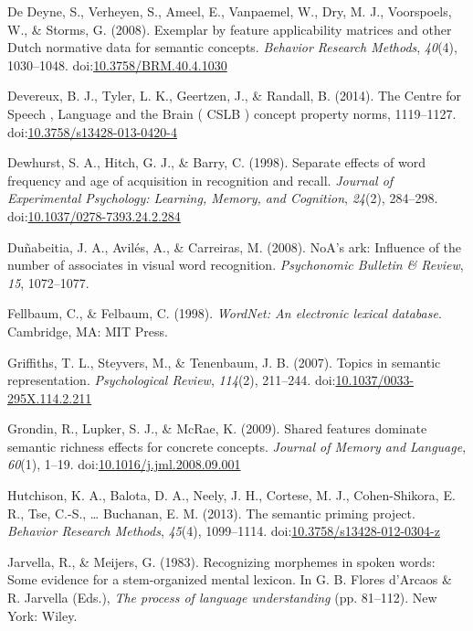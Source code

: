 \documentclass[english,,man]{apa6}
\theoremstyle{definition}
\theoremstyle{definition}
\theoremstyle{definition}
\theoremstyle{remark}
\begin{document}
\hypertarget{ref-DeDeyne2008}{}
De Deyne, S., Verheyen, S., Ameel, E., Vanpaemel, W., Dry, M. J.,
Voorspoels, W., \& Storms, G. (2008). Exemplar by feature applicability
matrices and other Dutch normative data for semantic concepts.
\emph{Behavior Research Methods}, \emph{40}(4), 1030--1048.
doi:\href{https://doi.org/10.3758/BRM.40.4.1030}{10.3758/BRM.40.4.1030}

\hypertarget{ref-Devereux2014}{}
Devereux, B. J., Tyler, L. K., Geertzen, J., \& Randall, B. (2014). The
Centre for Speech , Language and the Brain ( CSLB ) concept property
norms, 1119--1127.
doi:\href{https://doi.org/10.3758/s13428-013-0420-4}{10.3758/s13428-013-0420-4}

\hypertarget{ref-Dewhurst1998}{}
Dewhurst, S. A., Hitch, G. J., \& Barry, C. (1998). Separate effects of
word frequency and age of acquisition in recognition and recall.
\emph{Journal of Experimental Psychology: Learning, Memory, and
Cognition}, \emph{24}(2), 284--298.
doi:\href{https://doi.org/10.1037/0278-7393.24.2.284}{10.1037/0278-7393.24.2.284}

\hypertarget{ref-Dunabeitia2008}{}
Duñabeitia, J. A., Avilés, A., \& Carreiras, M. (2008). NoA's ark:
Influence of the number of associates in visual word recognition.
\emph{Psychonomic Bulletin \& Review}, \emph{15}, 1072--1077.

\hypertarget{ref-Felbaum1998}{}
Fellbaum, C., \& Felbaum, C. (1998). \emph{WordNet: An electronic
lexical database}. Cambridge, MA: MIT Press.

\hypertarget{ref-Griffiths2007}{}
Griffiths, T. L., Steyvers, M., \& Tenenbaum, J. B. (2007). Topics in
semantic representation. \emph{Psychological Review}, \emph{114}(2),
211--244.
doi:\href{https://doi.org/10.1037/0033-295X.114.2.211}{10.1037/0033-295X.114.2.211}

\hypertarget{ref-Grondin2009}{}
Grondin, R., Lupker, S. J., \& McRae, K. (2009). Shared features
dominate semantic richness effects for concrete concepts. \emph{Journal
of Memory and Language}, \emph{60}(1), 1--19.
doi:\href{https://doi.org/10.1016/j.jml.2008.09.001}{10.1016/j.jml.2008.09.001}

\hypertarget{ref-Hutchison2013}{}
Hutchison, K. A., Balota, D. A., Neely, J. H., Cortese, M. J.,
Cohen-Shikora, E. R., Tse, C.-S., \ldots{} Buchanan, E. M. (2013). The
semantic priming project. \emph{Behavior Research Methods},
\emph{45}(4), 1099--1114.
doi:\href{https://doi.org/10.3758/s13428-012-0304-z}{10.3758/s13428-012-0304-z}

\hypertarget{ref-Jarvella1983}{}
Jarvella, R., \& Meijers, G. (1983). Recognizing morphemes in spoken
words: Some evidence for a stem-organized mental lexicon. In G. B.
Flores d'Arcaos \& R. Jarvella (Eds.), \emph{The process of language
understanding} (pp. 81--112). New York: Wiley.
\end{document}
